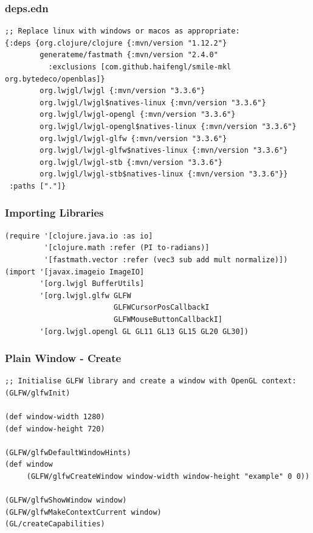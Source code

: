 \documentclass[aspectratio=169,11pt,xcolor=dvipsnames]{beamer}
\begin{document}
\begin{frame}[fragile]
  \frametitle{deps.edn}
  \begin{verbatim}
;; Replace linux with windows or macos as appropriate:
{:deps {org.clojure/clojure {:mvn/version "1.12.2"}
        generateme/fastmath {:mvn/version "2.4.0"
          :exclusions [com.github.haifengl/smile-mkl org.bytedeco/openblas]}
        org.lwjgl/lwjgl {:mvn/version "3.3.6"}
        org.lwjgl/lwjgl$natives-linux {:mvn/version "3.3.6"}
        org.lwjgl/lwjgl-opengl {:mvn/version "3.3.6"}
        org.lwjgl/lwjgl-opengl$natives-linux {:mvn/version "3.3.6"}
        org.lwjgl/lwjgl-glfw {:mvn/version "3.3.6"}
        org.lwjgl/lwjgl-glfw$natives-linux {:mvn/version "3.3.6"}
        org.lwjgl/lwjgl-stb {:mvn/version "3.3.6"}
        org.lwjgl/lwjgl-stb$natives-linux {:mvn/version "3.3.6"}}
 :paths ["."]}
  \end{verbatim}
\end{frame}

\begin{frame}[fragile]
  \frametitle{Importing Libraries}
  \begin{verbatim}
(require '[clojure.java.io :as io]
         '[clojure.math :refer (PI to-radians)]
         '[fastmath.vector :refer (vec3 sub add mult normalize)])
(import '[javax.imageio ImageIO]
        '[org.lwjgl BufferUtils]
        '[org.lwjgl.glfw GLFW
                         GLFWCursorPosCallbackI
                         GLFWMouseButtonCallbackI]
        '[org.lwjgl.opengl GL GL11 GL13 GL15 GL20 GL30])
  \end{verbatim}
\end{frame}

\begin{frame}[fragile]
  \frametitle{Plain Window {-} Create}
  \begin{verbatim}
;; Initialise GLFW library and create a window with OpenGL context:
(GLFW/glfwInit)

(def window-width 1280)
(def window-height 720)

(GLFW/glfwDefaultWindowHints)
(def window
     (GLFW/glfwCreateWindow window-width window-height "example" 0 0))

(GLFW/glfwShowWindow window)
(GLFW/glfwMakeContextCurrent window)
(GL/createCapabilities)
  \end{verbatim}
\end{frame}
\end{document}
